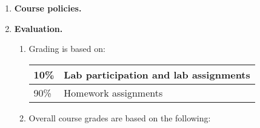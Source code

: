 \documentclass[10pt,titlepage,fleqn]{article}
\begin{document}
\begin{enumerate}

\pagebreak
\item {\bf Course policies.}



\item {\bf Evaluation.}

\begin{enumerate}

\item Grading is based on:

\begin{tabular}{|l|l|}
\hline
10\% & Lab participation and lab assignments \\ \hline
90\% & Homework assignments \\ \hline
\end{tabular}

\bigskip
\item Overall course grades are based on the following:


\end{enumerate}
\end{enumerate}
\end{document}
